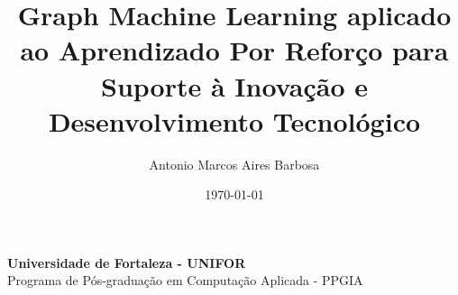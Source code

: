 \documentclass{article}
\begin{document}
\begin{spacing}{1.5}

\begin{titlepage}
    \centering
    \vspace*{1cm} %
    {\large \textbf{Universidade de Fortaleza - UNIFOR}\\ Programa de Pós-graduação em Computação Aplicada - PPGIA}
      
    \title{Graph Machine Learning aplicado ao Aprendizado Por Reforço para Suporte à Inovação e Desenvolvimento Tecnológico}
    
    \vspace*{4cm} %
    \author{Antonio Marcos Aires Barbosa} %

    \date{\today}
\end{titlepage}

\maketitle

\clearpage
\tableofcontents

\clearpage
{} %

\












\end{spacing}
\end{document}
